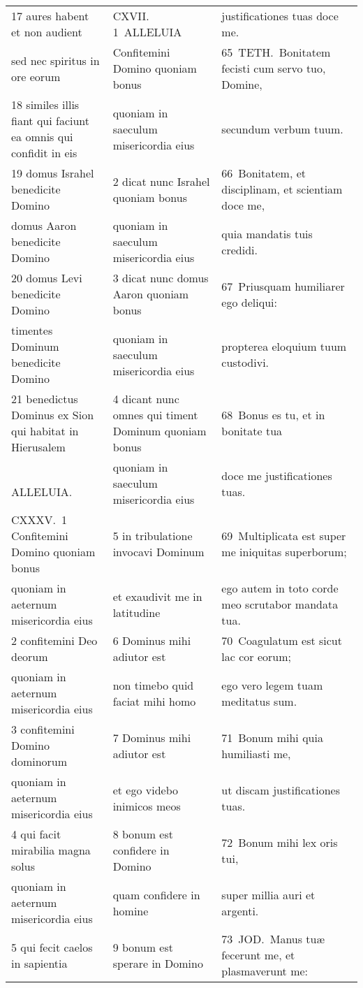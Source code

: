 \documentclass{article}
\begin{document}
\begin{longtable}{@{}p{}p{}p{}@{}}
17 aures habent et non audient	&	CXVII. 1 ALLELUIA	&	justificationes tuas doce me.	\\
sed nec spiritus in ore eorum	&	Confitemini Domino quoniam bonus	&	65 TETH. Bonitatem fecisti cum servo tuo, Domine,	\\
18 similes illis fiant qui faciunt ea omnis qui confidit in eis	&	quoniam in saeculum misericordia eius	&	secundum verbum tuum.	\\
19 domus Israhel benedicite Domino	&	2 dicat nunc Israhel quoniam bonus	&	66 Bonitatem, et disciplinam, et scientiam doce me,	\\
domus Aaron benedicite Domino	&	quoniam in saeculum misericordia eius	&	quia mandatis tuis credidi.	\\
20 domus Levi benedicite Domino	&	3 dicat nunc domus Aaron quoniam bonus	&	67 Priusquam humiliarer ego deliqui:	\\
timentes Dominum benedicite Domino	&	quoniam in saeculum misericordia eius	&	propterea eloquium tuum custodivi.	\\
21 benedictus Dominus ex Sion qui habitat in Hierusalem	&	4 dicant nunc omnes qui timent Dominum quoniam bonus	&	68 Bonus es tu, et in bonitate tua	\\
    ALLELUIA.	&	quoniam in saeculum misericordia eius	&	doce me justificationes tuas.	\\
CXXXV. 1 Confitemini Domino quoniam bonus	&	5 in tribulatione invocavi Dominum	&	69 Multiplicata est super me iniquitas superborum;	\\
quoniam in aeternum misericordia eius	&	et exaudivit me in latitudine	&	ego autem in toto corde meo scrutabor mandata tua.	\\
2 confitemini Deo deorum	&	6 Dominus mihi adiutor est	&	70 Coagulatum est sicut lac cor eorum;	\\
quoniam in aeternum misericordia eius	&	non timebo quid faciat mihi homo	&	ego vero legem tuam meditatus sum.	\\
3 confitemini Domino dominorum	&	7 Dominus mihi adiutor est	&	71 Bonum mihi quia humiliasti me,	\\
quoniam in aeternum misericordia eius	&	et ego videbo inimicos meos	&	ut discam justificationes tuas.	\\
4 qui facit mirabilia magna solus	&	8 bonum est confidere in Domino	&	72 Bonum mihi lex oris tui,	\\
quoniam in aeternum misericordia eius	&	quam confidere in homine	&	super millia auri et argenti.	\\
5 qui fecit caelos in sapientia	&	9 bonum est sperare in Domino	&	73 JOD. Manus tuæ fecerunt me, et plasmaverunt me:	\\

\end{longtable}
\end{document}
